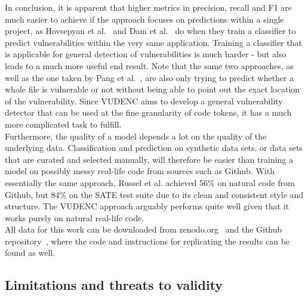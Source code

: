 \documentclass[
a4paper,
pagesize,
pdftex,
12pt,
ngerman,
fleqn,
final,
]{scrartcl}
\begin{document}
	In conclusion, it is apparent that higher metrics in precision, recall and F1 are much easier to achieve if the approach focuses on predictions within a single project, as Hovsepyan et al.~\cite{Hovsepyan.2012} and Dam et al.~\cite{Dam.2017} do when they train a classifier to predict vulnerabilities within the very same application. Training a classifier that is applicable for general detection of vulnerabilities is much harder - but also leads to a much more useful end result. Note that the same two approaches, as well as the one taken by Pang et al.~\cite{Pang.2015}, are also only trying to predict whether a whole file is vulnerable or not without being able to point out the exact location of the vulnerability. Since VUDENC aims to develop a general vulnerability detector that can be used at the fine granularity of code tokens, it has a much more complicated task to fulfill.\\	
	Furthermore, the quality of a model depends a lot on the quality of the underlying data. Classification and prediction on synthetic data sets, or data sets that are curated and selected manually, will therefore be easier than training a model on possibly messy real-life code from sources such as Github. With essentially the same approach, Russel et al. achieved 56\% on natural code from Github, but 84\% on the SATE test suite due to its clean and consistent style and structure. The VUDENC approach arguably performs quite well given that it works purely on natural real-life code. \\
	All data for this work can be downloaded from zenodo.org~\cite{Wartschinski.2.12.2019b,Wartschinski.1.12.2019,Wartschinski.2.12.2019c} and the Github repository~\cite{Wartschinski.2.12.2019}, where the code and instructions for replicating the results can be found as well. 
	
	
	\subsection{Limitations and threats to validity}
	
\end{document}
